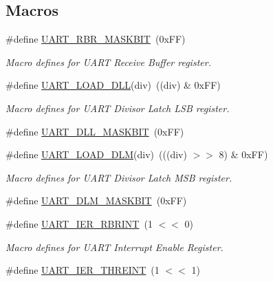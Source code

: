 \subsection*{Macros}
\begin{DoxyCompactItemize}
\item 
\#define \hyperlink{group__UART__17XX__40XX_ga06774e65c2ca095c4373122ed9a390b8}{U\-A\-R\-T\-\_\-\-R\-B\-R\-\_\-\-M\-A\-S\-K\-B\-I\-T}~(0x\-F\-F)
\begin{DoxyCompactList}\small\item\em Macro defines for U\-A\-R\-T Receive Buffer register. \end{DoxyCompactList}\item 
\#define \hyperlink{group__UART__17XX__40XX_ga55a89461d99a43769772276e51a6710a}{U\-A\-R\-T\-\_\-\-L\-O\-A\-D\-\_\-\-D\-L\-L}(div)~((div) \& 0x\-F\-F)
\begin{DoxyCompactList}\small\item\em Macro defines for U\-A\-R\-T Divisor Latch L\-S\-B register. \end{DoxyCompactList}\item 
\#define \hyperlink{group__UART__17XX__40XX_ga85050a24048ffc2de997cd60ea67f9df}{U\-A\-R\-T\-\_\-\-D\-L\-L\-\_\-\-M\-A\-S\-K\-B\-I\-T}~(0x\-F\-F)
\item 
\#define \hyperlink{group__UART__17XX__40XX_gac53f4cc36f13edd3fdf7fd9bab1360e2}{U\-A\-R\-T\-\_\-\-L\-O\-A\-D\-\_\-\-D\-L\-M}(div)~(((div) $>$$>$ 8) \& 0x\-F\-F)
\begin{DoxyCompactList}\small\item\em Macro defines for U\-A\-R\-T Divisor Latch M\-S\-B register. \end{DoxyCompactList}\item 
\#define \hyperlink{group__UART__17XX__40XX_gaf4d480e07f82896893e45b572adeffcd}{U\-A\-R\-T\-\_\-\-D\-L\-M\-\_\-\-M\-A\-S\-K\-B\-I\-T}~(0x\-F\-F)
\item 
\#define \hyperlink{group__UART__17XX__40XX_gafe8ecd345fb121d6b0ce19f4ce6672ba}{U\-A\-R\-T\-\_\-\-I\-E\-R\-\_\-\-R\-B\-R\-I\-N\-T}~(1 $<$$<$ 0)
\begin{DoxyCompactList}\small\item\em Macro defines for U\-A\-R\-T Interrupt Enable Register. \end{DoxyCompactList}\item 
\#define \hyperlink{group__UART__17XX__40XX_gaa0d5f875782af503852f8b8f93292673}{U\-A\-R\-T\-\_\-\-I\-E\-R\-\_\-\-T\-H\-R\-E\-I\-N\-T}~(1 $<$$<$ 1)
\item 
$$
\end{DoxyCompactItemize}
